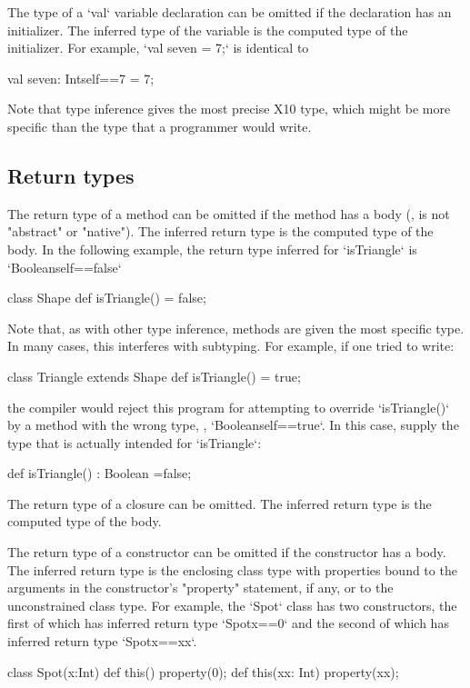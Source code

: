 The type of a \xcd`val` variable declaration can be omitted if the
declaration has an initializer.  The inferred type of the
variable is the computed type of the initializer.
For example, 
\xcd`val seven = 7;`
is identical to 
\begin{xtenmath}
val seven: Int{self==7} = 7;
\end{xtenmath}
Note that type inference gives the most precise X10 type, which might be more
specific than the type that a programmer would write.




\subsection{Return types}

The return type of a method can be omitted if the method has a body (\ie, is
not \xcd"abstract" or \xcd"native"). The inferred return type is the computed
type of the body.  In the following example, the return type inferred for
\xcd`isTriangle` is 
\xcd`Boolean{self==false}`
\begin{xten}
class Shape {
  def isTriangle() = false; 
}  
\end{xten}
%
Note that, as with other type inference, methods are given the most specific
type.  In many cases, this interferes with subtyping.  For example, if one
tried to write: 
\begin{xten}
class Triangle extends Shape {
  def isTriangle() = true;
}
\end{xten}
\noindent
the compiler would reject this program for attempting to override
\xcd`isTriangle()` by a method with the wrong type, \viz,
\xcd`Boolean{self==true}`.  In this case, supply the type that is actually
intended for \xcd`isTriangle`: 
\begin{xtenmath}
def isTriangle() : Boolean =false;
\end{xtenmath}

The return type of a closure can be omitted.
The inferred return type is the computed type of the body.

The return type of a constructor can be omitted if the
constructor has a body.
The inferred return type is the enclosing class type with
properties bound to the arguments in the constructor's \xcd"property"
statement, if any, or to the unconstrained class type.
For example, the \xcd`Spot` class has two constructors, the first of which has
inferred return type \xcd`Spot{x==0}` and the second of which has 
inferred return type \xcd`Spot{x==xx}`. 
\begin{xten}
class Spot(x:Int) {
  def this() {property(0);}
  def this(xx: Int) { property(xx); }
}
\end{xten}


